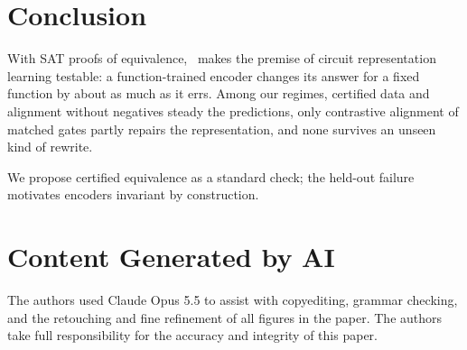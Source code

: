 \section{Conclusion}
With SAT proofs of equivalence, \audit\ makes the premise of circuit representation learning testable: a
function-trained encoder changes its answer for a fixed function by about as much as it errs. Among our regimes, certified data and
alignment without negatives steady the predictions, only contrastive alignment of matched gates partly repairs the
representation, and none survives an unseen kind of rewrite.


\mainonly{\noindent}We propose certified equivalence as a standard check; the held-out failure motivates encoders
invariant by construction.

\section*{Content Generated by AI}
The authors used Claude Opus 5.5 to assist with copyediting, grammar checking, and the retouching and fine refinement of all figures in the paper. The authors take full
responsibility for the accuracy and integrity of this paper.
